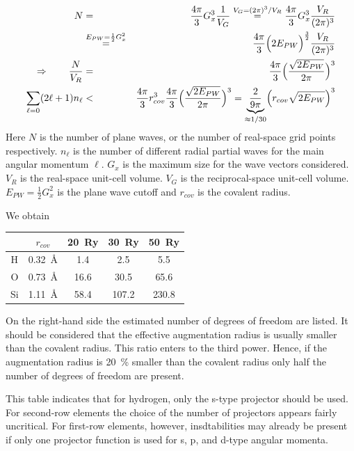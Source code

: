 \documentclass[final,12pt]{article}
\begin{document}
{{{{{{\begin{eqnarray}
N&=&\frac{4\pi}{3}G_x^3\frac{1}{V_G}
\stackrel{V_G=(2\pi)^3/V_R}{=}
\frac{4\pi}{3}G_x^3\frac{V_R}{(2\pi)^3}
\nonumber\\
&\stackrel{E_{PW}=\frac{1}{2}G_x^2}{=}&
\frac{4\pi}{3}\Bigl(2 E_{PW}\Bigr)^\frac{3}{2}\frac{V_R}{(2\pi)^3}
\nonumber\\
\Rightarrow\qquad
\frac{N}{V_R}&=&\frac{4\pi}{3}\Bigl(
\frac{\sqrt{2E_{PW}}}{2\pi}
\Bigr)^3
\nonumber\\
\sum_{\ell=0}(2\ell+1)n_\ell&<&
\frac{4\pi}{3}r_{cov}^3\frac{4\pi}{3}\Bigl(
\frac{\sqrt{2E_{PW}}}{2\pi}
\Bigr)^3
=\underbrace{\frac{2}{9\pi}}_{\approx 1/30}\Bigl(r_{cov}\sqrt{2E_{PW}}\Bigr)^3
\end{eqnarray}
Here $N$ is the number of plane waves, or the number of real-space
grid points respectively. $n_\ell$ is the number of different radial
partial waves for the main angular momentum $\ell$.  $G_x$ is the
maximum size for the wave vectors considered. $V_R$ is the real-space
unit-cell volume. $V_G$ is the reciprocal-space unit-cell
volume. $E_{PW}=\frac{1}{2}G_x^2$ is the plane wave cutoff and
$r_{cov}$ is the covalent radius.


We obtain
\begin{center}
\begin{tabular}{|c|c|c|c|c|}
\hline
  &$r_{cov}$ & 20~Ry & 30~Ry & 50~Ry\\
\hline
H & 0.32~\AA &  1.4 & 2.5  &  5.5\\
O & 0.73~\AA & 16.6 & 30.5 & 65.6\\ 
Si& 1.11~\AA & 58.4 & 107.2 & 230.8\\
\hline
\end{tabular}
\end{center}
On the right-hand side the estimated number of degrees of freedom are
listed. It should be considered that the effective augmentation radius
is usually smaller than the covalent radius. This ratio enters to the
third power. Hence, if the augmentation radius is 20~\% smaller than
the covalent radius only half the number of degrees of freedom are
present.

This table indicates that for hydrogen, only the s-type projector
should be used. For second-row elements the choice of the number of
projectors appears fairly uncritical. For first-row elements, however,
insdtabilities may already be present if only one projector function
is used for s, p, and d-type angular momenta.


\newpage
}}}}}}
\end{document}
